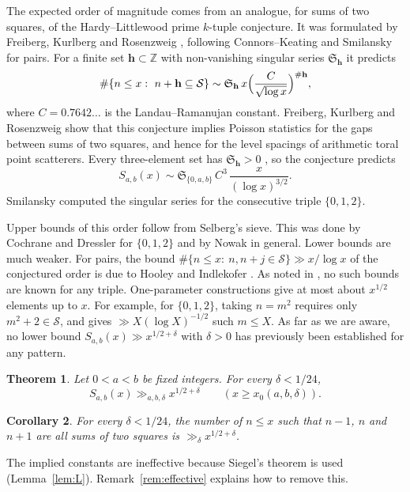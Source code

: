 \documentclass[11pt]{amsart}
\newtheorem{theorem}{Theorem}[section]
\newtheorem{corollary}[theorem]{Corollary}
\theoremstyle{remark}
\theoremstyle{definition}
\numberwithin{equation}{section}
\newcommand{\Sc}{\mathcal{S}}
\newcommand{\Z}{\mathbb{Z}}
\begin{document}
The expected order of magnitude comes from an analogue, for sums of two squares, of the Hardy--Littlewood prime $k$-tuple conjecture. It was formulated by Freiberg, Kurlberg and Rosenzweig \cite[Conjecture~1.1]{FKR}, following Connors--Keating \cite{CK} and Smilansky \cite{Sm} for pairs. For a finite set $\mathbf h\subset\Z$ with non-vanishing singular series $\mathfrak S_{\mathbf h}$ it predicts
\[
\#\{n\le x:\ n+\mathbf h\subseteq\Sc\}\sim\mathfrak S_{\mathbf h}\,x\Bigl(\frac{C}{\sqrt{\log x}}\Bigr)^{\#\mathbf h},
\]
where $C=0.7642\ldots$ is the Landau--Ramanujan constant. Freiberg, Kurlberg and Rosenzweig show that this conjecture implies Poisson statistics for the gaps between sums of two squares, and hence for the level spacings of arithmetic toral point scatterers. Every three-element set has $\mathfrak S_{\mathbf h}>0$ \cite[\S2.1]{FKR}, so the conjecture predicts
\[
S_{a,b}(x)\sim\mathfrak S_{\{0,a,b\}}\,C^3\,\frac{x}{(\log x)^{3/2}}.
\]
Smilansky \cite{Sm} computed the singular series for the consecutive triple $\{0,1,2\}$.

Upper bounds of this order follow from Selberg's sieve. This was done by Cochrane and Dressler \cite{CD} for $\{0,1,2\}$ and by Nowak \cite{No} in general. Lower bounds are much weaker. For pairs, the bound $\#\{n\le x:\ n,n+j\in\Sc\}\gg x/\log x$ of the conjectured order is due to Hooley \cite{Ho74} and Indlekofer \cite{In}. As noted in \cite{FKR}, no such bounds are known for any triple. One-parameter constructions give at most about $x^{1/2}$ elements up to $x$. For example, for $\{0,1,2\}$, taking $n=m^2$ requires only $m^2+2\in\Sc$, and \cite[Theorem~2]{FI78} gives $\gg X(\log X)^{-1/2}$ such $m\le X$. As far as we are aware, no lower bound $S_{a,b}(x)\gg x^{1/2+\delta}$ with $\delta>0$ has previously been established for any pattern.

\begin{theorem}\label{thm:main}
Let $0<a<b$ be fixed integers. For every $\delta<1/24$,
\[
S_{a,b}(x)\gg_{a,b,\delta}x^{1/2+\delta}\qquad(x\ge x_0(a,b,\delta)).
\]
\end{theorem}

\begin{corollary}\label{cor:consecutive}
For every $\delta<1/24$, the number of $n\le x$ such that $n-1$, $n$ and $n+1$ are all sums of two squares is $\gg_\delta x^{1/2+\delta}$.
\end{corollary}

The implied constants are ineffective because Siegel's theorem is used (Lemma~\ref{lem:L}). Remark~\ref{rem:effective} explains how to remove this.
\end{document}
